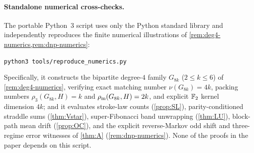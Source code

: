 \paragraph{Standalone numerical cross-checks.} The portable Python~3 script  uses
only the Python standard library and independently reproduces the finite numerical illustrations of
\cref{rem:deg4-numerics,rem:dnp-numerics}:
\begin{center}
\texttt{python3 tools/reproduce\_numerics.py}
\end{center}
Specifically, it constructs the bipartite degree-$4$ family $G_{8k}$ ($2 \le k \le 6$) of \cref{rem:deg4-numerics},
verifying exact matching number $\nu(G_{8k}) = 4k$, packing numbers $\rho_3(G_{8k}, H) = k$ and $\rho_{\mathrm{m}}(G_{8k}, H) = 2k$,
and explicit $\mathbb{F}_2$ kernel dimension $4k$; and it evaluates stroke-law counts (\cref{prop:SL}), parity-conditioned straddle
sums (\cref{thm:Vstar}), super-Fibonacci band unwrapping (\cref{thm:LU}), block-path mean drift (\cref{prop:OC}), and the
explicit reverse-Markov odd shift and three-regime error witnesses of \cref{thm:A} (\cref{rem:dnp-numerics}). None of the
proofs in the paper depends on this script.

